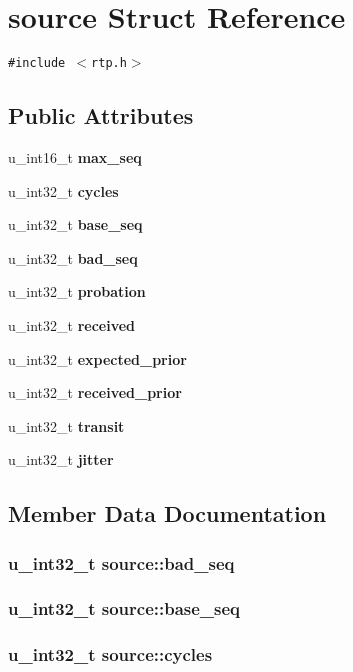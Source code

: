 \section{source Struct Reference}
\label{structsource}
{\tt \#include $<$rtp.h$>$}

\subsection*{Public Attributes}
\begin{CompactItemize}
\item 
u\_\-int16\_\-t {\bf max\_\-seq}
\item 
u\_\-int32\_\-t {\bf cycles}
\item 
u\_\-int32\_\-t {\bf base\_\-seq}
\item 
u\_\-int32\_\-t {\bf bad\_\-seq}
\item 
u\_\-int32\_\-t {\bf probation}
\item 
u\_\-int32\_\-t {\bf received}
\item 
u\_\-int32\_\-t {\bf expected\_\-prior}
\item 
u\_\-int32\_\-t {\bf received\_\-prior}
\item 
u\_\-int32\_\-t {\bf transit}
\item 
u\_\-int32\_\-t {\bf jitter}
\end{CompactItemize}


\subsection{Member Data Documentation}
\subsubsection{\setlength{\rightskip}{0pt plus 5cm}u\_\-int32\_\-t {\bf source::bad\_\-seq}}\label{structsource_o3}


\subsubsection{\setlength{\rightskip}{0pt plus 5cm}u\_\-int32\_\-t {\bf source::base\_\-seq}}\label{structsource_o2}


\subsubsection{\setlength{\rightskip}{0pt plus 5cm}u\_\-int32\_\-t {\bf source::cycles}}\label{structsource_o1}


